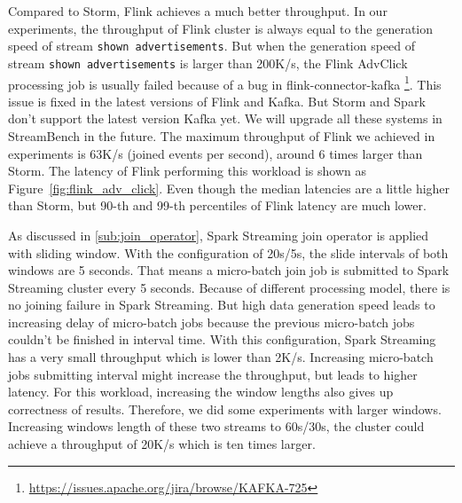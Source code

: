 
Compared to Storm, Flink achieves a much better throughput. In our experiments, the throughput of Flink cluster is always equal to the generation speed of stream \texttt{shown advertisements}. But when the generation speed of stream \texttt{shown advertisements} is larger than 200K/s, the Flink AdvClick processing job is usually failed because of a bug in flink-connector-kafka \footnote{\url{https://issues.apache.org/jira/browse/KAFKA-725}}. This issue is fixed in the latest versions of Flink and Kafka. But Storm and Spark don't support the latest version Kafka yet. We will upgrade all these systems in StreamBench in the future. The maximum throughput of Flink we achieved in experiments is 63K/s (joined events per second), around 6 times larger than Storm. The latency of Flink performing this workload is shown as Figure~\ref{fig:flink_adv_click}. Even though the median latencies are a little higher than Storm, but 90-th and 99-th percentiles of Flink latency are much lower. 

As discussed in \cref{sub:join_operator}, Spark Streaming join operator is applied with sliding window. With the configuration of 20s/5s, the slide intervals of both windows are 5 seconds. That means a micro-batch join job is submitted to Spark Streaming cluster every 5 seconds. Because of different processing model, there is no joining failure in Spark Streaming. But high data generation speed leads to increasing delay of micro-batch jobs because the previous micro-batch jobs couldn't be finished in interval time. With this configuration, Spark Streaming has a very small throughput which is lower than 2K/s. Increasing micro-batch jobs submitting interval might increase the throughput, but leads to higher latency. For this workload, increasing the window lengths also gives up correctness of results. Therefore, we did some experiments with larger windows. Increasing windows length of these two streams to 60s/30s, the cluster could achieve a throughput of 20K/s which is ten times larger. 

